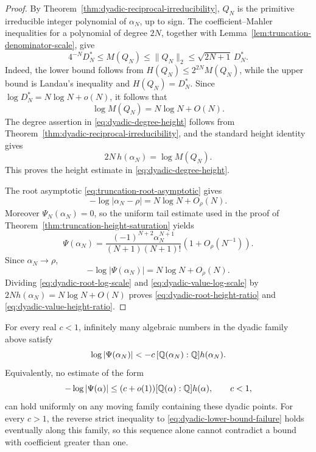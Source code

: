 \begin{proof}
By Theorem~\ref{thm:dyadic-reciprocal-irreducibility}, \(Q_N\) is the
primitive irreducible integer polynomial of \(\alpha_N\), up to sign.
The coefficient--Mahler inequalities for a polynomial of degree \(2N\),
together with Lemma~\ref{lem:truncation-denominator-scale}, give
\begin{equation}\label{eq:dyadic-mahler-bounds}
 4^{-N}D_N^*
 \leq M(Q_N)
 \leq \lVert Q_N\rVert_2
 \leq \sqrt{2N+1}\,D_N^*.
\end{equation}
Indeed, the lower bound follows from
\(H(Q_N)\leq2^{2N}M(Q_N)\), while the upper bound is Landau's inequality
and \(H(Q_N)=D_N^*\).  Since
\(\log D_N^*=N\log N+o(N)\), it follows that
\begin{equation}\label{eq:dyadic-mahler-asymptotic}
 \log M(Q_N)=N\log N+O(N).
\end{equation}
The degree assertion in \eqref{eq:dyadic-degree-height} follows from
Theorem~\ref{thm:dyadic-reciprocal-irreducibility}, and the standard height
identity gives
\[
 2N\,h(\alpha_N)=\log M(Q_N).
\]
This proves the height estimate in \eqref{eq:dyadic-degree-height}.

The root asymptotic \eqref{eq:truncation-root-asymptotic} gives
\begin{equation}\label{eq:dyadic-root-log-scale}
 -\log|\alpha_N-\rho|=N\log N+O_\rho(N).
\end{equation}
Moreover \(\Psi_N(\alpha_N)=0\), so the uniform tail estimate used in
the proof of Theorem~\ref{thm:truncation-height-saturation} yields
\[
 \Psi(\alpha_N)
 =\frac{(-1)^{N+2}\alpha_N^{N+1}}
 {(N+1)(N+1)!}
 \left(1+O_\rho(N^{-1})\right).
\]
Since \(\alpha_N\to\rho\),
\begin{equation}\label{eq:dyadic-value-log-scale}
 -\log|\Psi(\alpha_N)|=N\log N+O_\rho(N).
\end{equation}
Dividing \eqref{eq:dyadic-root-log-scale} and
\eqref{eq:dyadic-value-log-scale} by
\(2N h(\alpha_N)=N\log N+O(N)\) proves
\eqref{eq:dyadic-root-height-ratio} and
\eqref{eq:dyadic-value-height-ratio}.
\end{proof}

\begin{corollary}
\label{cor:dyadic-moving-point-threshold}
For every real \(c<1\), infinitely many algebraic numbers in the dyadic
family above satisfy
\begin{equation}\label{eq:dyadic-lower-bound-failure}
 \log|\Psi(\alpha_N)|
 <-c\,[\mathbb Q(\alpha_N):\mathbb Q]h(\alpha_N).
\end{equation}
Equivalently, no estimate of the form
\[
 -\log|\Psi(\alpha)|
 \leq(c+o(1))[\mathbb Q(\alpha):\mathbb Q]h(\alpha),
 \qquad c<1,
\]
can hold uniformly on any moving family containing these dyadic points.
For every \(c>1\), the reverse strict inequality to
\eqref{eq:dyadic-lower-bound-failure} holds eventually along this family,
so this sequence alone cannot contradict a bound with coefficient greater
than one.
\end{corollary}

